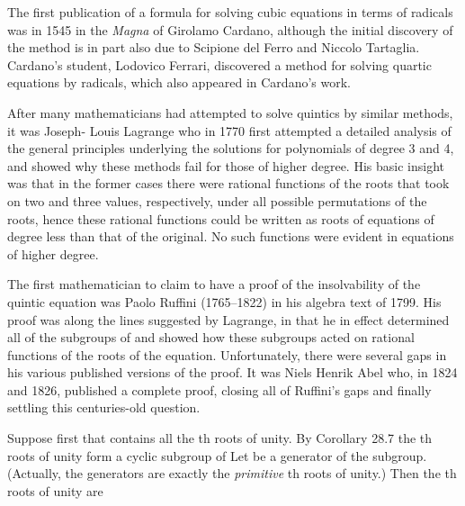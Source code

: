 \documentclass[11pt,oneside]{article}
\begin{document}
\BookNarrativetrue

\begin{BookBody}


\noindent The first publication of a formula for solving cubic equations in terms of radicals was in 1545 in the  \textit{Magna} of Girolamo Cardano, although the initial discovery of the method is in part also due to Scipione del Ferro and Niccolo Tartaglia. Cardano’s student, Lodovico Ferrari, discovered a method for solving quartic equations by radicals, which also appeared in Cardano’s work.

\noindent After many mathematicians had attempted to solve quintics by similar methods, it was Joseph- Louis Lagrange who in 1770 first attempted a detailed analysis of the general principles underlying the solutions for polynomials of degree 3 and 4, and showed why these methods fail for those of higher degree. His basic insight was that in the former cases there were rational functions of the roots that took on two and three values, respectively, under all possible permutations of the roots, hence these rational functions could be written as roots of equations of degree less than that of the original. No such functions were evident in equations of higher degree.

The first mathematician to claim to have a proof of the insolvability of the quintic equation was Paolo Ruffini (1765–1822) in his algebra text of 1799. His proof was along the lines suggested by Lagrange, in that he in effect determined all of the subgroups of  and showed how these subgroups acted on rational functions of the roots of the equation. Unfortunately, there were several gaps in his various published versions of the proof. It was Niels Henrik Abel who, in 1824 and 1826, published a complete proof, closing all of Ruffini’s gaps and finally settling this centuries-old question.

 Suppose first that  contains all the th roots of unity. By Corollary 28.7 the th roots of unity form a cyclic subgroup of  Let \BookInline{\zeta } be a generator of the subgroup. (Actually, the generators are exactly the\textit{ primitive} th roots of unity.) Then the th roots of unity are


\end{BookBody}
\end{document}
